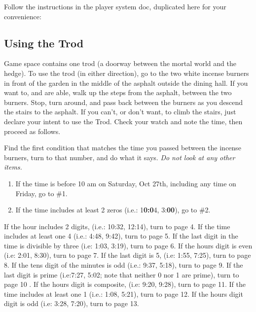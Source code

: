 \documentclass[green]{gl2018}
\begin{document}
\name{\gTrod{}}
\newcommand{\areastart}[1]{ \begin{huge}{\bf \#{#1}} \end{huge} \\}
\newenvironment{sect}[1]{\begin{minipage}{\textwidth}\areastart{#1}\\}{\end{minipage}\vspace{2in}}

Follow the instructions in the player system doc, duplicated here for your convenience:
\begin{addmargin}[0.5in]{0em}

\subsection*{Using the Trod}

Game space contains one trod (a doorway between the mortal world and the hedge). To use the trod (in either direction), go to the two white incense burners in front of the garden in the middle of the asphalt outside the dining hall. If you want to, and are able, walk up the steps from the asphalt, between the two burners. Stop, turn around, and pass back between the burners as you descend the stairs to the asphalt. If you can’t, or don’t want, to climb the stairs, just declare your intent to use the Trod. Check your watch and note the time, then proceed as follows.
\end{addmargin}
Find the first condition that matches the time you passed between the incense burners, turn to that number, and do what it says. {\em Do not look at any other items.}
\begin{enumerate}
\item If the time is before 10 am on Saturday, Oct 27th, including any time on Friday, go to \#1.
\item 
If the time includes at least 2 zeros (i.e.: 1\textbf{0:0}4, 3:\textbf{00}), go to \#2.
\end{enumerate}
If the hour includes 2 digits, (i.e.: 10:32, 12:14), turn to page 4. 
If the time includes at least one 4 (i.e.: 4:48, 9:42), turn to page 5. 
If the last digit in the time is divisible by three (i.e: 1:03, 3:19), turn to page 6.
If the hours digit is even (i.e: 2:01, 8:30), turn to page 7.
If the last digit is 5, (i.e: 1:55, 7:25), turn to page 8. 
If the tens digit of the minutes is odd (i.e.: 9:37, 5:18), turn to page 9.
If the last digit is prime (i.e:7:27, 5:02; note that neither 0 nor 1 are prime), turn to page 10 .
If the hours digit is composite, (i.e: 9:20, 9:28), turn to page 11.
If the time includes at least one 1 (i.e.: 1:08, 5:21), turn to page 12.
If the hours digit digit is odd (i.e: 3:28, 7:20), turn to page 13.

\pagebreak
\end{document}
